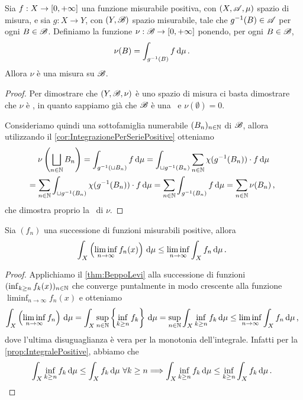 \begin{lemma}\label{lemma:MisuraIntegrale}
	Sia $f:X\to[0,+\infty]$ una funzione misurabile positiva, con $(X,\mathscr A,\mu)$ spazio di misura, e sia $g:X\to Y$, con $(Y,\mathscr B)$ spazio misurabile, tale che $g^{-1}(B)\in\mathscr A$ per ogni $B\in\mathscr B$. Definiamo la funzione $\nu:\mathscr B\to[0,+\infty]$ ponendo, per ogni $B\in\mathscr B$,
	\begin{equation*}
		\nu(B)=\int_{g^{-1}(B)}f\,\mathrm d\mu\, \text{. }
	\end{equation*}
	Allora $\nu$ è una misura su $\mathscr B$.
\end{lemma}
\begin{proof}
	Per dimostrare che $(Y,\mathscr B,\nu)$ è uno spazio di misura ci basta dimostrare che $\nu$ è \sigadd, in quanto sappiamo già che $\mathscr B$ è una \sigalg\ e $\nu(\emptyset)=0$.
	
	Consideriamo quindi una sottofamiglia numerabile $(B_n)_{n\in\mathbb N}$ di $\mathscr B$, allora utilizzando il \cref{cor:IntegrazionePerSeriePositive} otteniamo
	\begin{multline*}
		\nu\left(\bigsqcup_{n\in\mathbb N}B_n\right)=\int_{g^{-1}(\sqcup B_n)}f\,\mathrm d\mu=\int_{\sqcup g^{-1}(B_n)}\sum_{n\in\mathbb N}\chi(g^{-1}(B_n))\cdot f\,\mathrm d\mu\\
		=\sum_{n\in\mathbb N}\int_{\sqcup g^{-1}(B_n)}\chi(g^{-1}(B_n))\cdot f\,\mathrm d\mu=
		\sum_{n\in\mathbb N}\int_{g^{-1}(B_n)}f\,\mathrm d\mu=\sum_{n\in\mathbb N}\nu(B_n)\, \text{, }
	\end{multline*}
	che dimostra proprio la \sigadd\ di $\nu$.
\end{proof}

\begin{lemma}[Fatou] \label{lemma:Fatou}
	Sia $(f_n)$ una successione di funzioni misurabili positive, allora 
	\begin{equation*}
		\int_X\left(\liminf_{n\to\infty}f_n(x)\right)\,\mathrm d\mu\le \liminf_{n\to\infty}\int_Xf_n\,\mathrm d\mu\, \text{. }
	\end{equation*}
\end{lemma}

\begin{proof}
	Applichiamo il \cref{thm:BeppoLevi} alla successione di funzioni $(\inf_{k\ge n}f_k(x))_{n\in\mathbb N}$ che converge puntalmente in modo crescente alla funzione $\liminf_{n\to\infty}f_n(x)$ e otteniamo
	\begin{equation*}
		\int_X\left(\liminf_{n\to\infty}f_n\right)\,\mathrm d\mu=\int_X \sup_{n\in\mathbb N}\left\{\inf_{k\ge n}f_k\right\}\,\mathrm d\mu=\sup_{n\in\mathbb N}\int_X \inf_{k\ge n}f_k\,\mathrm d\mu\le \liminf_{n\to\infty}\int_Xf_n\,\mathrm d\mu\, \text{, }
	\end{equation*}
	dove l'ultima disuguaglianza è vera per la monotonia dell'integrale. Infatti per la \cref{prop:IntegralePositive}, abbiamo che
	\begin{equation*}
		\int_X \inf_{k\ge n}f_k\,\mathrm d\mu\le \int_Xf_k\,\mathrm d\mu \ \forall k\ge n \Longrightarrow \int_X \inf_{k\ge n}f_k\,\mathrm d\mu\le \inf_{k\ge n}\int_Xf_k\,\mathrm d\mu\, \text{. }
	\end{equation*}
\end{proof}


